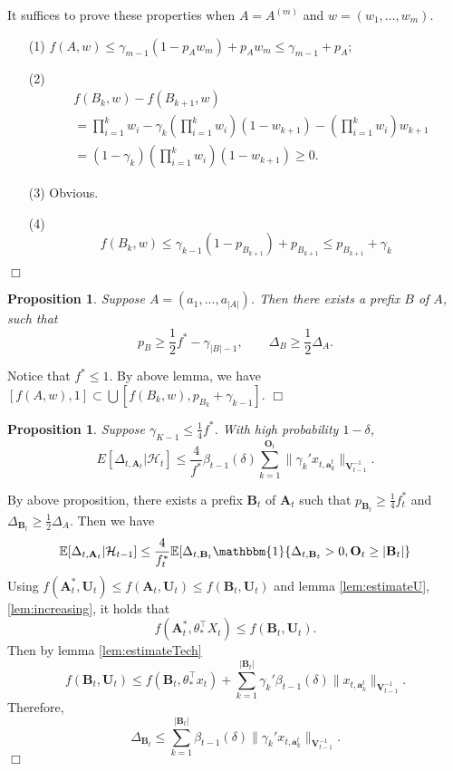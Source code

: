 \documentclass{article}
\newcommand{\EE}{\mathbb{E}}
\newcommand{\bOne}{\mathbbm{1}}
\newcommand{\bA}{\mathbf{A}}
\newcommand{\ba}{\mathbf{a}}
\newcommand{\bB}{\mathbf{B}}
\newcommand{\bO}{\mathbf{O}}
\newcommand{\bU}{\mathbf{U}}
\newcommand{\bV}{\mathbf{V}}
\newcommand{\cH}{\mathcal{H}}
\newcommand{\abs}[1]{\left| #1 \right|}
\newcommand{\norm}[1]{\| #1 \|}
\newtheorem{proposition}[theorem]{Proposition}%
\newenvironment{proof}{\noindent {\textbf{Proof. }}}{$\Box$ \medskip}
\begin{document}
\begin{proof}
It suffices to prove these properties when $A = A^{(m)}$ and $w = (w_1, \ldots, w_m)$.
\begin{itemize}
\item[(1)]
$f(A, w) \leq \gamma_{m-1}(1 - p_A w_m) + p_A w_m \leq \gamma_{m-1} + p_A$;

\item[(2)]
\begin{align*}
&f(B_k, w) - f(B_{k+1}, w)\\
&=\prod_{i=1}^{k}w_i - \gamma_{k} (\prod_{i=1}^{k}w_i) (1 - w_{k+1}) - (\prod_{i=1}^{k}w_i) w_{k+1}\\
&=(1 - \gamma_{k}) (\prod_{i=1}^{k}w_i) (1 - w_{k+1}) \geq 0.
\end{align*}

\item[(3)]
Obvious.

\item[(4)]
$$
f(B_k, w) \leq \gamma_{k-1} (1 - p_{B_{k+1}}) + p_{B_{k+1}}\leq p_{B_{k+1}} + \gamma_{k}
$$
\end{itemize}
\end{proof}

\begin{proposition}
Suppose $A = (a_1, ..., a_{\abs{A}})$. Then there exists a prefix $B$ of $A$, such that 
$$
p_{B} \geq \frac{1}{2}f^* - \gamma_{\abs{B}-1}, \qquad \Delta_{B} \geq \frac{1}{2}\Delta_A.
$$ 
\end{proposition}
\begin{proof}
	Notice that $f^* \leq 1$. By above lemma, we have $[f(A,w), 1] \subset \bigcup [f(B_k,w), p_{B_k} + \gamma_{k-1}]$.
\end{proof}


\begin{proposition}
Suppose $\gamma_{K-1} \leq \frac{1}{4} f^*$. With high probability $1-\delta$, 
$$
E[\Delta_{t, \bA_t}|\cH_t] \leq \frac{4}{f^*} \beta_{t-1}(\delta)\sum_{k=1}^{\bO_t}\norm{\gamma_k' x_{t,\ba_k^t}}_{\bV_{t-1}^{-1}}.
$$
\end{proposition}
\begin{proof}
By above proposition, there exists a prefix $\bB_t$ of $\bA_t$ such that $p_{\bB_t} \geq \frac{1}{4}f_t^*$ and $\Delta_{\bB_t} \geq \frac{1}{2}\Delta_A$. Then we have
$$
\EE[\Delta_{t, \bA_t} | \cH_{t-1}] \leq \frac{4}{f_t^*} \EE[\Delta_{t, \bB_t} \bOne\{\Delta_{t, \bB_t} > 0, \bO_t \geq \abs{\bB_t}\}
$$
Using $f(\bA_t^*,\bU_t) \leq f(\bA_t,\bU_t) \leq f(\bB_t,\bU_t)$ and lemma \ref{lem:estimateU}, \ref{lem:increasing}, it holds that
$$
f(\bA_t^*, \theta_*^{\top}X_t) \leq f(\bB_t,\bU_t).
$$
Then by lemma \ref{lem:estimateTech}
$$
f(\bB_t,\bU_t) \leq f(\bB_t, \theta_*^{\top}x_t) + \sum_{k=1}^{\abs{\bB_t}}\gamma_k'\beta_{t-1}(\delta)\norm{x_{t,\ba_k^t}}_{\bV_{t-1}^{-1}}.
$$
Therefore,
$$
\Delta_{\bB_t} \leq \sum_{k=1}^{\abs{\bB_t}}\beta_{t-1}(\delta)\norm{\gamma_k' x_{t,\ba_k^t}}_{\bV_{t-1}^{-1}}.
$$
\end{proof}
	
\end{document}

